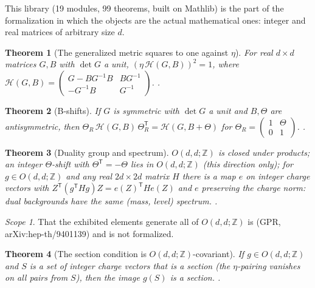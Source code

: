 \documentclass[11pt,a4paper]{report}
\newtheorem{theorem}{Theorem}[chapter]
\theoremstyle{remark}
\newtheorem*{scope}{Scope}
\begin{document}
This library (19 modules, 99 theorems, built on Mathlib) is the part of the formalization in which the
objects are the actual mathematical ones: integer and real matrices of arbitrary size $d$.

\begin{theorem}[The generalized metric squares to one against $\eta$]\label{thm:s2_genmetric}
\leanok
For real $d\times d$ matrices $G,B$ with $\det G$ a unit, $(\eta\,\mathcal{H}(G,B))^2=1$, where
$\mathcal{H}(G,B)=\begin{pmatrix}G-BG^{-1}B & BG^{-1}\\ -G^{-1}B & G^{-1}\end{pmatrix}$. \TA{}.
\end{theorem}

\begin{theorem}[B-shifts]
\leanok
If $G$ is symmetric with $\det G$ a unit and $B,\Theta$ are antisymmetric, then
$\Theta_R\,\mathcal{H}(G,B)\,\Theta_R^{\mathsf T}=\mathcal{H}(G,B+\Theta)$ for
$\Theta_R=\begin{pmatrix}1&\Theta\\0&1\end{pmatrix}$. \TA{}.
\end{theorem}

\begin{theorem}[Duality group and spectrum]
\leanok
$O(d,d;\mathbb{Z})$ is closed under products;
\leanok
an integer $\Theta$-shift with $\Theta^{\mathsf T}=-\Theta$ lies in $O(d,d;\mathbb{Z})$ (this direction only);
\leanok
for $g\in O(d,d;\mathbb{Z})$ and any real $2d\times2d$ matrix $H$ there is a map $e$ on integer charge
vectors with $Z^{\mathsf T}(g^{\mathsf T}Hg)Z=e(Z)^{\mathsf T}He(Z)$ and $e$ preserving the charge norm:
dual backgrounds have the same (mass, level) spectrum. \TA{}.
\end{theorem}
\begin{scope}
That the exhibited elements generate all of $O(d,d;\mathbb{Z})$ is \TL{} (GPR, arXiv:hep-th/9401139) and is
not formalized.
\end{scope}

\begin{theorem}[The section condition is $O(d,d;\mathbb{Z})$-covariant]\label{thm:s2_section}
\leanok
If $g\in O(d,d;\mathbb{Z})$ and $S$ is a set of integer charge vectors that is a section (the $\eta$-pairing
vanishes on all pairs from $S$), then the image $g(S)$ is a section. \TA{}.
\end{theorem}
\end{document}
